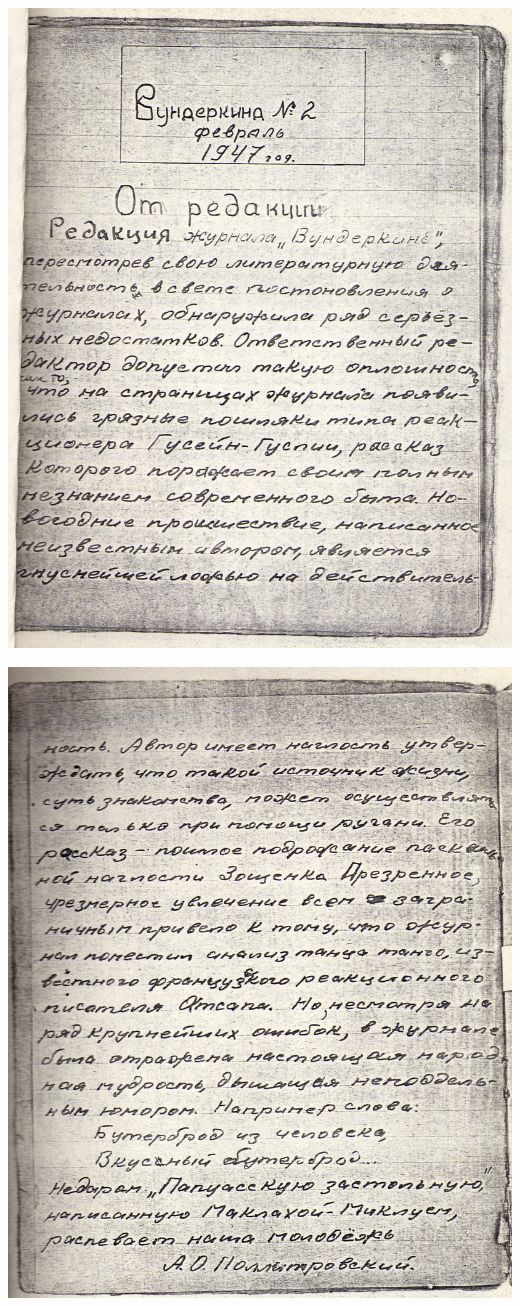 \noindent
\includegraphics[width=\textwidth]{inc/Vynd/Vynd002}

\noindent
\includegraphics[width=\textwidth]{inc/Vynd/Vynd003}

